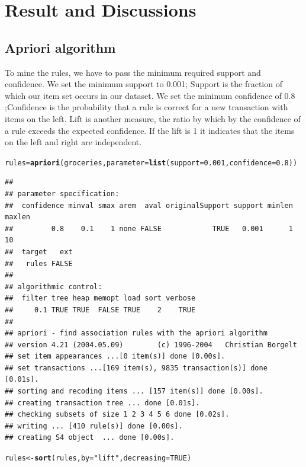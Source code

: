 \documentclass{article}\usepackage[]{graphicx}\usepackage[]{color}
\makeatletter
\newcommand{\hlnum}[1]{\textcolor[rgb]{0.686,0.059,0.569}{#1}}%
\newcommand{\hlstr}[1]{\textcolor[rgb]{0.192,0.494,0.8}{#1}}%
\newcommand{\hlstd}[1]{\textcolor[rgb]{0.345,0.345,0.345}{#1}}%
\newcommand{\hlkwb}[1]{\textcolor[rgb]{0.69,0.353,0.396}{#1}}%
\newcommand{\hlkwc}[1]{\textcolor[rgb]{0.333,0.667,0.333}{#1}}%
\newcommand{\hlkwd}[1]{\textcolor[rgb]{0.737,0.353,0.396}{\textbf{#1}}}%
\newenvironment{kframe}{%
 \def\at@end@of@kframe{}%
 \ifinner\ifhmode%
  \def\at@end@of@kframe{\end{minipage}}%
  \begin{minipage}{\columnwidth}%
 \fi\fi%
 \def\FrameCommand##1{\hskip\@totalleftmargin \hskip-\fboxsep
 \colorbox{shadecolor}{##1}\hskip-\fboxsep
     \hskip-\linewidth \hskip-\@totalleftmargin \hskip\columnwidth}%
 \MakeFramed {\advance\hsize-\width
   \@totalleftmargin\z@ \linewidth\hsize
   \@setminipage}}%
 {\par\unskip\endMakeFramed%
 \at@end@of@kframe}
\newenvironment{knitrout}{}{} %
\makeatother
\begin{document}
\section{Result and Discussions}
\subsection{Apriori algorithm}\hspace{0.9cm}To mine the rules, we have to pass the minimum required support and confidence. We set the minimum support to 0.001; Support is the fraction of which our item set occurs in our dataset. We set the minimum confidence of 0.8 ;Confidence is the probability that a rule is correct for a new transaction with items on the left. Lift is another measure, the ratio by which by the confidence of a rule exceeds the expected confidence. If the lift is 1 it indicates that the items on the left and right are independent.\par
\begin{knitrout}
\color{fgcolor}\begin{kframe}
\begin{alltt}
\hlstd{rules} \hlkwb{=} \hlkwd{apriori}\hlstd{(groceries,} \hlkwc{parameter}\hlstd{=}\hlkwd{list}\hlstd{(}\hlkwc{support}\hlstd{=}\hlnum{0.001}\hlstd{,} \hlkwc{confidence}\hlstd{=}\hlnum{0.8}\hlstd{))}
\end{alltt}
\begin{verbatim}
## 
## parameter specification:
##  confidence minval smax arem  aval originalSupport support minlen maxlen
##         0.8    0.1    1 none FALSE            TRUE   0.001      1     10
##  target   ext
##   rules FALSE
## 
## algorithmic control:
##  filter tree heap memopt load sort verbose
##     0.1 TRUE TRUE  FALSE TRUE    2    TRUE
## 
## apriori - find association rules with the apriori algorithm
## version 4.21 (2004.05.09)        (c) 1996-2004   Christian Borgelt
## set item appearances ...[0 item(s)] done [0.00s].
## set transactions ...[169 item(s), 9835 transaction(s)] done [0.01s].
## sorting and recoding items ... [157 item(s)] done [0.00s].
## creating transaction tree ... done [0.01s].
## checking subsets of size 1 2 3 4 5 6 done [0.02s].
## writing ... [410 rule(s)] done [0.00s].
## creating S4 object  ... done [0.00s].
\end{verbatim}
\begin{alltt}
\hlstd{rules}\hlkwb{<-}\hlkwd{sort}\hlstd{(rules,} \hlkwc{by}\hlstd{=}\hlstr{"lift"}\hlstd{,} \hlkwc{decreasing}\hlstd{=}\hlnum{TRUE}\hlstd{)}
\end{alltt}
\end{kframe}
\end{knitrout}
\end{document}
